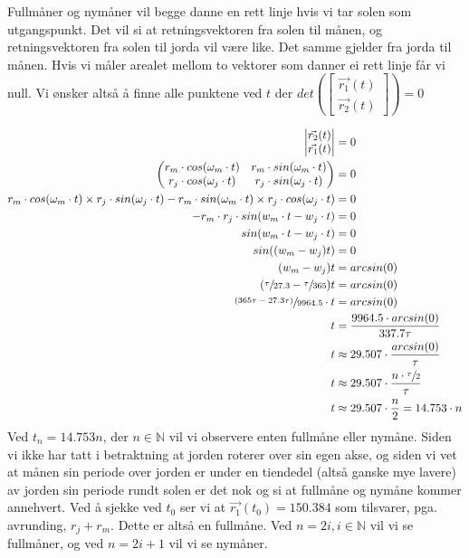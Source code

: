 \documentclass{../../myassignment}
\begin{document}
	\begin{answer}
		Fullm{\aa}ner og nym{\aa}ner vil begge danne en rett linje hvis vi tar solen som utgangspunkt. Det vil si at retningsvektoren fra solen til m{\aa}nen, og retningsvektoren fra solen til jorda vil v{\ae}re like. Det samme gjelder fra jorda til m{\aa}nen. Hvis vi m{\aa}ler arealet mellom to vektorer som danner ei rett linje f{\aa}r vi null. Vi {\o}nsker alts{\aa} {\aa} finne alle punktene ved $t$ der $det (\begin{bmatrix}{\vec{r_1}(t)} \\ {\vec{r_2}}(t)\end{bmatrix}) = 0$

		\begin{align*}
			\begin{vmatrix}{\vec{r_2}(t)} \\ \vec{r_1}(t) \end{vmatrix} &= 0\\
			\begin{pmatrix} r_m\cdot cos(\omega_m \cdot t) & r_m \cdot sin(\omega_m \cdot t) \\ r_j\cdot cos(\omega_j \cdot t) & r_j \cdot sin(\omega_j \cdot t) \end{pmatrix} &= 0 \\
			r_m\cdot cos(\omega_m \cdot t) \times r_j \cdot sin(\omega_j \cdot t) - r_m \cdot sin(\omega_m \cdot t) \times r_j\cdot cos(\omega_j \cdot t) &= 0 \\
			-r_m \cdot r_j \cdot sin(w_m \cdot t - w_j \cdot t) &= 0 \\
			sin(w_m \cdot t - w_j \cdot t) &= 0 \\
			sin((w_m - w_j)t) &= 0 \\
			(w_m - w_j)t &= arcsin(0) \\
			(\sfrac{\tau}{27.3} - \sfrac{\tau}{365})t &= arcsin(0) \\
			\sfrac{(365\tau - 27.3\tau)}{9964.5} \cdot t &= arcsin(0) \\
			t &= \dfrac{9964.5 \cdot arcsin(0)}{337.7\tau} \\
			t &\approx 29.507 \cdot \dfrac{arcsin(0)}{\tau} \\
			t &\approx 29.507 \cdot \dfrac{n \cdot \sfrac{\tau}{2}}{\tau} \\
			t &\approx 29.507 \cdot \dfrac{n}{2} = 14.753\cdot n \\
		\end{align*}
		Ved $t_n = 14.753n$, der $n \in \mathbb{N}$ vil vi observere enten fullm{\aa}ne eller nym{\aa}ne. Siden vi ikke har tatt i betraktning at jorden roterer over sin egen akse, og siden vi vet at m{\aa}nen sin periode over jorden er under en tiendedel (alts{\aa} ganske mye lavere) av jorden sin periode rundt solen er det nok og si at fullm{\aa}ne og nym{\aa}ne kommer annehvert. Ved {\aa} sjekke ved $t_0$ ser vi at $\vec{r_1}(t_0) = 150.384$ som tilsvarer, pga. avrunding, $r_j + r_m$. Dette er alts{\aa} en fullm{\aa}ne. Ved $n=2i, i\in\mathbb{N}$ vil vi se fullm{\aa}ner, og ved $n=2i+1$ vil vi se nym{\aa}ner.


\end{answer}
\end{document}
